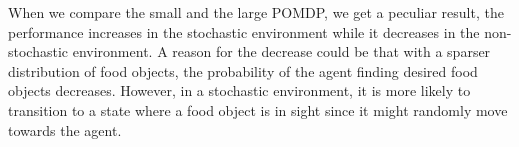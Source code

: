 \documentclass[12pt,A4]{report}
\theoremstyle{definition}
\begin{document}
When we compare the small and the large POMDP, we get a peculiar result, the performance increases in the stochastic environment while it decreases in the non-stochastic environment. A reason for the decrease could be that with a sparser distribution of food objects, the probability of the agent finding desired food objects decreases. However, in a stochastic environment, it is more likely to transition to a state where a food object is in sight since it might randomly move towards the agent.






\end{document}
